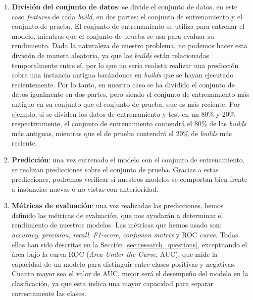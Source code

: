 \begin{enumerate}
    \item \textbf{División del conjunto de datos}: se divide el conjunto de datos, en este caso
    \textit{features} de cada \textit{build}, en dos partes: el conjunto de entrenamiento y el
    conjunto de prueba. El conjunto de entrenamiento se utiliza para entrenar el modelo, mientras
    que el conjunto de prueba se usa para evaluar su rendimiento. Dada la naturaleza de nuestro
    problema, no podemos hacer esta división de manera aleatoria, ya que las \textit{builds} están
    relacionadas temporalmente entre sí, por lo que no sería realista realizar una predicción
    sobre una instancia antigua basándonos en \textit{builds} que se hayan ejecutado recientemente.
    Por lo tanto, en nuestro caso se ha dividido el conjunto de datos igualmente en dos partes,
    pero siendo el conjunto de entrenamiento más antiguo en su conjunto que el conjunto de prueba,
    que es más reciente. Por ejemplo, si se dividen los datos de entrenamiento y test en un 80\% y
    20\% respectivamente, el conjunto de entrenamiento contendrá el 80\% de las \textit{builds}
    más antiguas, mientras que el de prueba contendrá el 20\% de \textit{builds} más reciente.\\
    \item \textbf{Predicción}: una vez entrenado el modelo con el conjunto de entrenamiento, se
    realizan predicciones sobre el conjunto de prueba. Gracias a estas predicciones, podremos
    verificar si nuestros modelos se comportan bien frente a instancias nuevas o no vistas con
    anterioridad.\\
    \item \textbf{Métricas de evaluación}: una vez realizadas las predicciones, hemos definido
    las métricas de evaluación, que nos ayudarán a determinar el rendimiento de nuestros modelos.
    Las métricas que hemos usado son: \textit{accuracy}, \textit{precision}, \textit{recall},
    \textit{F1-score}, \textit{confusion matrix} y ROC \textit{curve}. Todas
    ellas han sido descritas en la Sección \ref{sec:research_questions}, exceptuando el área
    bajo la curva ROC (\textit{Area Under the Curve}, AUC), que mide la capacidad de
    un modelo para distinguir entre clases positivas y negativas. Cuanto mayor sea el valor de
    AUC, mejor será el desempeño del modelo en la clasificación, ya que esta indica una
    mayor capacidad para separar correctamente las clases.
\end{enumerate}

